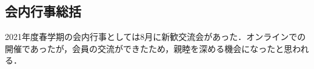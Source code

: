 \subsection*{会内行事総括}


2021年度春学期の会内行事としては8月に新歓交流会があった．オンラインでの開催であったが，会員の交流ができたため，親睦を深める機会になったと思われる．
